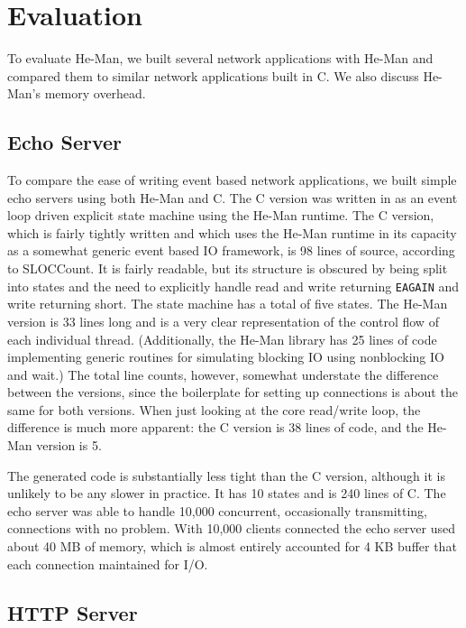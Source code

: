 \documentclass[preprint]{sigplanconf}
\renewcommand{\t}{\texttt}
\begin{document}
\section{Evaluation}\label{sec:evaluation}

To evaluate He-Man, we built several network applications with He-Man
and compared them to similar network applications built in C.  We also
discuss He-Man's memory overhead.

\subsection{Echo Server}

To compare the ease of writing event based network applications, we
built simple echo servers using both He-Man and C. The C version was
written in as an event loop driven explicit state machine using the
He-Man runtime. The C version, which is fairly tightly written and
which uses the He-Man runtime in its capacity as a somewhat generic
event based IO framework, is 98 lines of source, according to
SLOCCount. It is fairly readable, but its structure is obscured by
being split into states and the need to explicitly handle read and
write returning \t{EAGAIN} and write returning short. The state
machine has a total of five states. The He-Man version is 33 lines
long and is a very clear representation of the control flow of each
individual thread. (Additionally, the He-Man library has 25 lines of
code implementing generic routines for simulating blocking IO using
nonblocking IO and wait.) The total line counts, however, somewhat
understate the difference between the versions, since the boilerplate
for setting up connections is about the same for both versions. When
just looking at the core read/write loop, the difference is much more
apparent: the C version is 38 lines of code, and the He-Man version is
5.

The generated code is substantially less tight than the C version,
although it is unlikely to be any slower in practice. It has 10 states
and is 240 lines of C. The echo server was able to handle 10,000
concurrent, occasionally transmitting, connections with no
problem. With 10,000 clients connected the echo server used about 40
MB of memory, which is almost entirely accounted for 4 KB buffer that
each connection maintained for I/O.

\subsection{HTTP Server}
\end{document}
